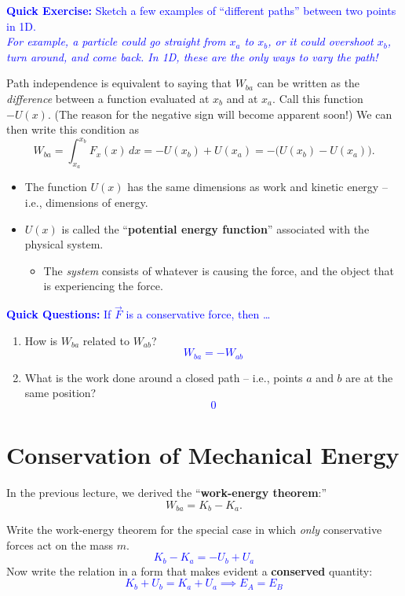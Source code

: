 \documentclass[11pt, letterpaper, openany]{book}
\newenvironment{exercise}[1][Exercise]{%
  \tcolorbox[blanker, breakable, left=1em,
    before skip=1em, after skip=1em,
    borderline west={3pt}{0pt}{PhysNavy},
    colback=PhysCream,
    before upper={\textcolor{PhysNavy}{\sffamily\bfseries #1:}\space}
  ]%
}{%
  \endtcolorbox%
}
\begin{document}
\textcolor{blue}{\textbf{Quick Exercise:} Sketch a few examples of ``different paths'' between two points in 1D. \\
\textit{For example, a particle could go straight from $x_a$ to $x_b$, or it could overshoot $x_b$, turn around, and come back. In 1D, these are the only ways to vary the path!}}

Path independence is equivalent to saying that $W_{ba}$ can be written as the \textit{difference} between a function evaluated at $x_b$ and at $x_a$. Call this function $-U(x)$. (The reason for the negative sign will become apparent soon!) We can then write this condition as
\[ W_{ba} = \int_{x_a}^{x_b} F_x(x)\,dx = -U(x_b) + U(x_a) = -\Big(U(x_b) - U(x_a)\Big). \tag{1} \]
\begin{itemize}
    \item The function $U(x)$ has the same dimensions as work and kinetic energy -- i.e., dimensions of energy.
    \item $U(x)$ is called the ``\textbf{potential energy function}'' associated with the physical system.
    \begin{itemize}
        \item The \textit{system} consists of whatever is causing the force, and the object that is experiencing the force.
    \end{itemize}
\end{itemize}

\textcolor{blue}{\textbf{Quick Questions:} If $\vec{F}$ is a conservative force, then \dots}
\begin{enumerate}
    \item How is $W_{ba}$ related to $W_{ab}$? \\
    \textcolor{blue}{\[ W_{ba} = -W_{ab} \]}
    \item What is the work done around a closed path -- i.e., points $a$ and $b$ are at the same position? \\
    \textcolor{blue}{\[ 0 \]}
\end{enumerate}

\section*{Conservation of Mechanical Energy}

In the previous lecture, we derived the ``\textbf{work-energy theorem}:''
\[ W_{ba} = K_b - K_a. \]

\begin{exercise}[Exercise 1]
Write the work-energy theorem for the special case in which \textit{only} conservative forces act on the mass $m$. \\
\textcolor{blue}{
\[ K_b - K_a = -U_b + U_a \]
}
Now write the relation in a form that makes evident a \textbf{conserved} quantity: \\
\textcolor{blue}{
\[ K_b + U_b = K_a + U_a \implies E_A = E_B \]
}
\end{exercise}
\end{document}
